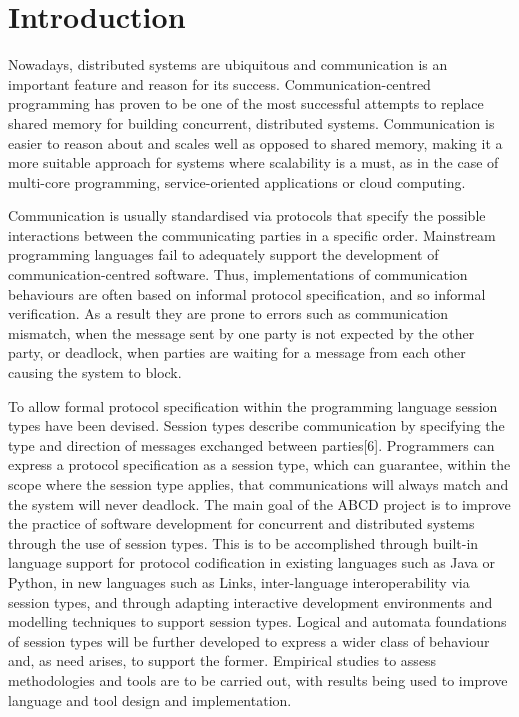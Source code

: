 \section{Introduction}


Nowadays, distributed systems are ubiquitous and communication is an important feature and reason for its success. Communication-centred programming has proven to be one of the most successful attempts to replace shared memory for building concurrent, distributed systems. Communication is easier to reason about and scales well as opposed to shared memory, making it a more suitable approach for systems where scalability is a must, as in the case of multi-core programming, service-oriented applications or cloud computing\cite{abcd}.

Communication is usually standardised via protocols that specify the possible interactions between the communicating parties in a specific order. Mainstream programming languages fail to adequately support the development of communication-centred software. Thus, implementations of communication behaviours are often based on informal protocol specification, and so informal verification. As a result they are prone to errors such as communication mismatch, when the message sent by one party is not expected by the other party, or deadlock, when parties are waiting for a message from each other causing the system to block\cite{abcd}.

To allow formal protocol specification within the programming language session types have been devised. Session types describe communication by specifying the type and direction of messages exchanged between parties[6]. Programmers can express a protocol specification as a session type, which can guarantee, within the scope where the session type applies, that communications will always match and the system will never deadlock.
The main goal of the ABCD project\cite{abcd} is to improve the practice of software development for concurrent and distributed systems through the use of session types. This is to be accomplished through built-in language support for protocol codification in existing languages such as Java or Python, in new languages such as Links\cite{links}, inter-language interoperability via session types, and through adapting interactive development environments and modelling techniques to support session types. Logical and automata foundations of session types will be further developed to express a wider class of behaviour and, as need arises, to support the former. Empirical studies to assess methodologies and tools are to be carried out, with results being used to improve language and tool design and implementation.

